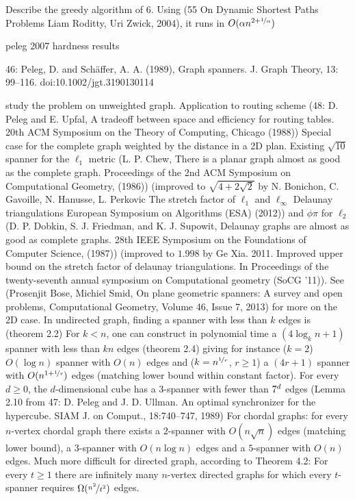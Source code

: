 
Describe the greedy algorithm of 6. Using (55 On Dynamic Shortest Paths Problems Liam Roditty, Uri
Zwick, 2004), it runs in $O(\alpha n^{2+\nicefrac{1}{\alpha}})$

peleg 2007 hardness results

46: Peleg, D. and Schäffer, A. A. (1989), Graph spanners. J. Graph Theory, 13: 99–116.
doi:10.1002/jgt.3190130114

study the problem on unweighted graph. Application to routing scheme (48: D. Peleg and E. Upfal, A
tradeoff between space and efficiency for routing tables. 20th ACM Symposium on the Theory of
Computing, Chicago (1988))
Special case for the complete graph weighted by the distance in a 2D plan. Existing $\sqrt{10}$
spanner for the $\ell_1$ metric (L. P. Chew, There is a planar graph almost as good as the complete
graph.  Proceedings of the 2nd ACM Symposium on Computational Geometry, (1986)) (improved to
$\sqrt{4+2\sqrt{2}}$ by N. Bonichon, C. Gavoille, N. Hanusse, L. Perkovic The stretch factor of
$\ell_1$ and $\ell_{\infty}$ Delaunay triangulations European Symposium on Algorithms (ESA) (2012))
and $\phi \pi$ for $\ell_2$ (D. P. Dobkin, S. J. Friedman, and K. J. Supowit, Delaunay graphs are
almost as good as complete graphs. 28th IEEE Symposium on the Foundations of Computer Science,
(1987)) (improved to $1.998$ by Ge Xia. 2011. Improved upper bound on the stretch factor of delaunay
triangulations. In Proceedings of the twenty-seventh annual symposium on Computational geometry
(SoCG '11)). See (Prosenjit Bose, Michiel Smid, On plane geometric spanners: A survey and open
problems, Computational Geometry, Volume 46, Issue 7, 2013) for more on the 2D case.
In undirected graph, finding a spanner with less than $k$ edges is \NPc{} (theorem 2.2)
For $k<n$, one can construct in polynomial time a $(4\log_k n +1)$ spanner with less than $kn$ edges
(theorem 2.4) giving for instance ($k=2$) $O(\log n)$ spanner with $O(n)$ edges and
($k=n^{\nicefrac{1}{r}}$, $r\geq 1$) a $(4r+1)$ spanner with $O(n^{1+\nicefrac{1}{r}})$ edges
(matching lower bound within constant factor). For every $d \geq 0$, the $d$-dimensional cube has a
$3$-spanner with fewer than $7\time 2^d$ edges (Lemma 2.10 from 47: D. Peleg and J. D. Ullman. An
optimal synchronizer for the hypercube. SIAM J. on Comput., 18:740–747, 1989)
For chordal graphs: for every $n$-vertex chordal graph there exists a $2$-spanner with
$O(n\sqrt{n})$ edges (matching lower bound), a $3$-spanner with $O(n \log n)$ edges and a $5$-spanner
with $O(n)$ edges.
Much more difficult for directed graph, according to Theorem 4.2: For every $t \geq 1$ there are
infinitely many $n$-vertex directed graphs for which every $t$-spanner requires
$\Omega(\nicefrac{n^2}{t^2})$ edges.

